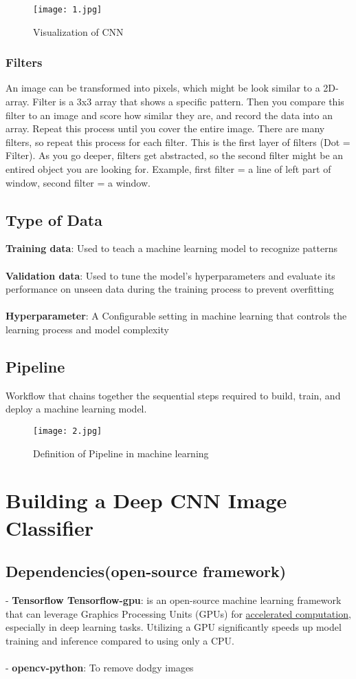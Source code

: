 \documentclass{article}
\begin{document}
\begin{figure}[H]
    \centering
    \texttt{[image: 1.jpg]}
    \caption{Visualization of CNN}
    \label{fig:placeholder}
\end{figure}

\subsubsection{Filters}
An image can be transformed into pixels, which might be look similar to a 2D-array. Filter is a 3x3 array that shows a specific pattern. Then you compare this filter to an image and score how similar they are, and record the data into an array. Repeat this process until you cover the entire image. There are many filters, so repeat this process for each filter. This is the first layer of filters (Dot = Filter). As you go deeper, filters get abstracted, so the second filter might be an entired object you are looking for. Example, first filter = a line of left part of window, second filter = a window.  

\subsection{Type of Data}
\textbf{Training data}: Used to teach a machine learning model to recognize patterns 
\\
\\
\textbf{Validation data}: Used to tune the model's hyperparameters and evaluate its performance on unseen data during the training process to prevent overfitting 
\\
\\
\textbf{Hyperparameter}: A Configurable setting in machine learning that controls the learning process and model complexity

\subsection{Pipeline}
Workflow that chains together the sequential steps required to build, train, and deploy a machine learning model.

\begin{figure}[H]
    \centering
    \texttt{[image: 2.jpg]}
    \caption{Definition of Pipeline in machine learning}
    \label{fig:placeholder}
\end{figure}

\section{Building a Deep CNN Image Classifier}
\subsection{Dependencies(open-source framework)}
- \textbf{Tensorflow Tensorflow-gpu}: is an open-source machine learning framework that can leverage Graphics Processing Units (GPUs) for \underline{accelerated computation}, especially in deep learning tasks. Utilizing a GPU significantly speeds up model training and inference compared to using only a CPU.
\\
\\
- \textbf{opencv-python}: To remove dodgy images
\end{document}
